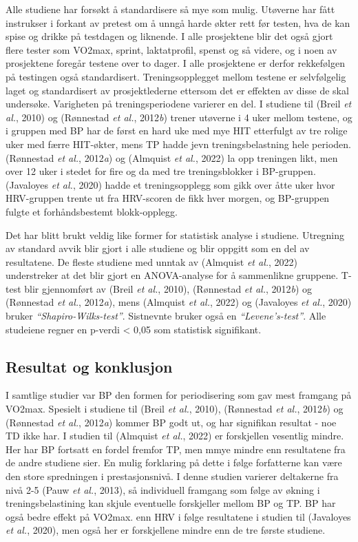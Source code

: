 \documentclass[
  letterpaper,
  DIV=11,
  numbers=noendperiod]{scrreprt}
\begin{document}
Alle studiene har forsøkt å standardisere så mye som mulig. Utøverne har
fått instrukser i forkant av pretest om å unngå harde økter rett før
testen, hva de kan spise og drikke på testdagen og liknende. I alle
prosjektene blir det også gjort flere tester som VO2max, sprint,
laktatprofil, spenst og så videre, og i noen av prosjektene foregår
testene over to dager. I alle prosjektene er derfor rekkefølgen på
testingen også standardisert. Treningsopplegget mellom testene er
selvfølgelig laget og standardisert av prosjektlederne ettersom det er
effekten av disse de skal undersøke. Varigheten på treningsperiodene
varierer en del. I studiene til (Breil \emph{et al.}, 2010) og
(Rønnestad \emph{et al.}, 2012\emph{b}) trener utøverne i 4 uker mellom
testene, og i gruppen med BP har de først en hard uke med mye HIT
etterfulgt av tre rolige uker med færre HIT-økter, mens TP hadde jevn
treningsbelastning hele perioden. (Rønnestad \emph{et al.},
2012\emph{a}) og (Almquist \emph{et al.}, 2022) la opp treningen likt,
men over 12 uker i stedet for fire og da med tre treningsblokker i
BP-gruppen. (Javaloyes \emph{et al.}, 2020) hadde et treningsopplegg som
gikk over åtte uker hvor HRV-gruppen trente ut fra HRV-scoren de fikk
hver morgen, og BP-gruppen fulgte et forhåndsbestemt blokk-opplegg.

Det har blitt brukt veldig like former for statistisk analyse i
studiene. Utregning av standard avvik blir gjort i alle studiene og blir
oppgitt som en del av resultatene. De fleste studiene med unntak av
(Almquist \emph{et al.}, 2022) understreker at det blir gjort en
ANOVA-analyse for å sammenlikne gruppene. T-test blir gjennomført av
(Breil \emph{et al.}, 2010), (Rønnestad \emph{et al.}, 2012\emph{b}) og
(Rønnestad \emph{et al.}, 2012\emph{a}), mens (Almquist \emph{et al.},
2022) og (Javaloyes \emph{et al.}, 2020) bruker
\emph{``Shapiro-Wilks-test''}. Sistnevnte bruker også en
\emph{``Levene's-test''}. Alle studeiene regner en p-verdi \textless{}
0,05 som statistisk signifikant.

\subsection{Resultat og konklusjon}\label{resultat-og-konklusjon}

I samtlige studier var BP den formen for periodisering som gav mest
framgang på VO2max. Spesielt i studiene til (Breil \emph{et al.}, 2010),
(Rønnestad \emph{et al.}, 2012\emph{b}) og (Rønnestad \emph{et al.},
2012\emph{a}) kommer BP godt ut, og har signifikan resultat - noe TD
ikke har. I studien til (Almquist \emph{et al.}, 2022) er forskjellen
vesentlig mindre. Her har BP fortsatt en fordel fremfor TP, men mmye
mindre enn resultatene fra de andre studiene sier. En mulig forklaring
på dette i følge forfatterne kan være den store spredningen i
prestasjonsnivå. I denne studien varierer deltakerne fra nivå 2-5 (Pauw
\emph{et al.}, 2013), så individuell framgang som følge av økning i
treningsbelastining kan skjule eventuelle forskjeller mellom BP og TP.
BP har også bedre effekt på VO2max. enn HRV i følge resultatene i
studien til (Javaloyes \emph{et al.}, 2020), men også her er
forskjellene mindre enn de tre første studiene.
\end{document}
